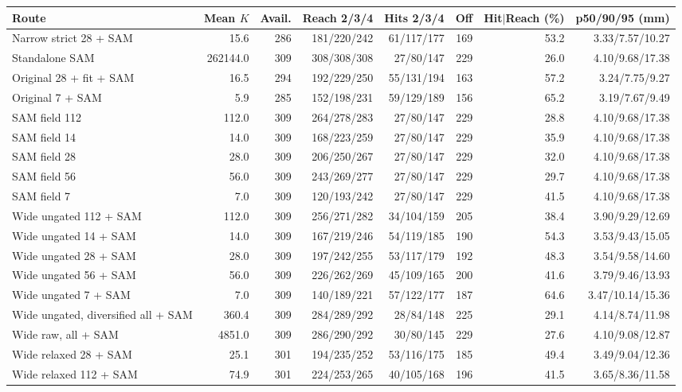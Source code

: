 \begin{tabular}{lrrrrrrr}
\toprule
Route & Mean $K$ & Avail. & Reach 2/3/4 & Hits 2/3/4 & Off & Hit$\mid$Reach (\%) & p50/90/95 (mm) \\
\midrule
Narrow strict 28 + SAM & 15.6 & 286 & 181/220/242 & 61/117/177 & 169 & 53.2 & 3.33/7.57/10.27 \\
Standalone SAM & 262144.0 & 309 & 308/308/308 & 27/80/147 & 229 & 26.0 & 4.10/9.68/17.38 \\
Original 28 + fit + SAM & 16.5 & 294 & 192/229/250 & 55/131/194 & 163 & 57.2 & 3.24/7.75/9.27 \\
Original 7 + SAM & 5.9 & 285 & 152/198/231 & 59/129/189 & 156 & 65.2 & 3.19/7.67/9.49 \\
SAM field 112 & 112.0 & 309 & 264/278/283 & 27/80/147 & 229 & 28.8 & 4.10/9.68/17.38 \\
SAM field 14 & 14.0 & 309 & 168/223/259 & 27/80/147 & 229 & 35.9 & 4.10/9.68/17.38 \\
SAM field 28 & 28.0 & 309 & 206/250/267 & 27/80/147 & 229 & 32.0 & 4.10/9.68/17.38 \\
SAM field 56 & 56.0 & 309 & 243/269/277 & 27/80/147 & 229 & 29.7 & 4.10/9.68/17.38 \\
SAM field 7 & 7.0 & 309 & 120/193/242 & 27/80/147 & 229 & 41.5 & 4.10/9.68/17.38 \\
Wide ungated 112 + SAM & 112.0 & 309 & 256/271/282 & 34/104/159 & 205 & 38.4 & 3.90/9.29/12.69 \\
Wide ungated 14 + SAM & 14.0 & 309 & 167/219/246 & 54/119/185 & 190 & 54.3 & 3.53/9.43/15.05 \\
Wide ungated 28 + SAM & 28.0 & 309 & 197/242/255 & 53/117/179 & 192 & 48.3 & 3.54/9.58/14.60 \\
Wide ungated 56 + SAM & 56.0 & 309 & 226/262/269 & 45/109/165 & 200 & 41.6 & 3.79/9.46/13.93 \\
Wide ungated 7 + SAM & 7.0 & 309 & 140/189/221 & 57/122/177 & 187 & 64.6 & 3.47/10.14/15.36 \\
Wide ungated, diversified all + SAM & 360.4 & 309 & 284/289/292 & 28/84/148 & 225 & 29.1 & 4.14/8.74/11.98 \\
Wide raw, all + SAM & 4851.0 & 309 & 286/290/292 & 30/80/145 & 229 & 27.6 & 4.10/9.08/12.87 \\
Wide relaxed 28 + SAM & 25.1 & 301 & 194/235/252 & 53/116/175 & 185 & 49.4 & 3.49/9.04/12.36 \\
Wide relaxed 112 + SAM & 74.9 & 301 & 224/253/265 & 40/105/168 & 196 & 41.5 & 3.65/8.36/11.58 \\

\end{tabular}
